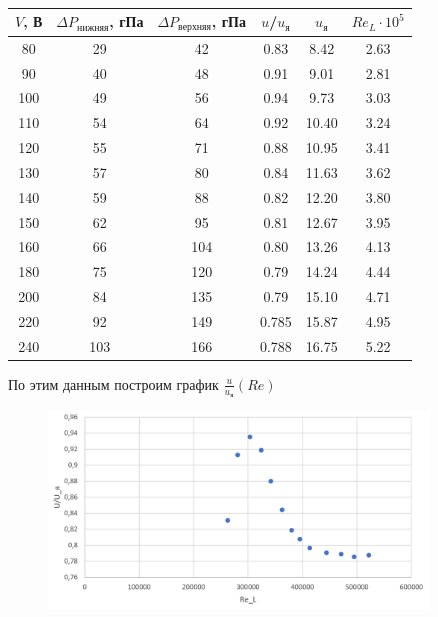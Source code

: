 \documentclass[a4paper]{article}
\begin{document}
\begin{table}[H]
\centering
\begin{tabular}{|c|c|c|c|c|c|}
\hline
$V$, В & $\Delta P_\text{нижняя}$, гПа & $\Delta P_\text{верхняя}$, гПа & $u$/$u_\text{я}$ & $u_\text{я}$ & $Re_L \cdot 10^5$  \\ \hline
80 & 29 & 42 & 0.83 & 8.42 & 2.63 \\ \hline
90 & 40 & 48 & 0.91 & 9.01 & 2.81 \\ \hline
100 & 49 & 56 & 0.94 & 9.73 & 3.03 \\ \hline
110 & 54 & 64 & 0.92 & 10.40 & 3.24 \\ \hline
120 & 55 & 71 & 0.88 & 10.95 & 3.41 \\ \hline
130 & 57 & 80 & 0.84 & 11.63 & 3.62 \\ \hline
140 & 59 & 88 & 0.82 & 12.20 & 3.80 \\ \hline
150 & 62 & 95 & 0.81 & 12.67 & 3.95 \\ \hline
160 & 66 & 104 & 0.80 & 13.26 & 4.13 \\ \hline
180 & 75 & 120 & 0.79 & 14.24 & 4.44 \\ \hline
200 & 84 & 135 & 0.79 & 15.10 & 4.71 \\ \hline
220 & 92 & 149 & 0.785 & 15.87 & 4.95 \\ \hline
240 & 103 & 166 & 0.788 & 16.75 & 5.22 \\ \hline

\end{tabular}
\caption{}
\end{table}

По этим данным построим график $\frac{u}{u_\text{я}} (Re)$
\begin {figure}[H]
\begin{center}
\par
\includegraphics[width=0.9\textwidth]{u-uz.png}
\caption{}
\end{center}
\end {figure}
\end{document}
